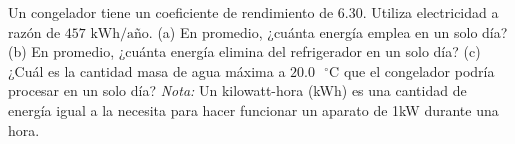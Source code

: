 \item Un congelador tiene un coeficiente de rendimiento de 6.30. Utiliza electricidad a razón de $457\text{ kWh/a\~no}$. (a) En promedio, ¿cuánta energía emplea en un solo día? (b) En promedio, ¿cuánta energía elimina del refrigerador en un solo día? (c) ¿Cuál es la cantidad masa de agua máxima a $20.0\text{ }^\circ\text{C}$ que el congelador podría procesar en un solo día? \textit{Nota:} Un kilowatt-hora (kWh) es una cantidad de energía igual a la necesita para hacer funcionar un aparato de 1kW durante una hora.
